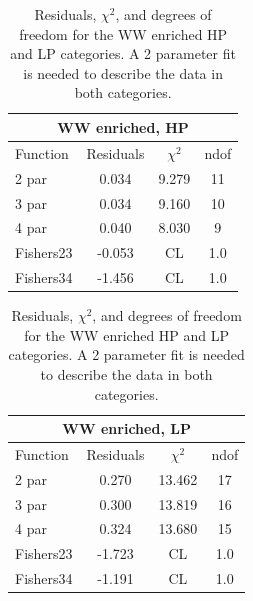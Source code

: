 \begin{table}[h!]
\centering
\begin{tabular}{|l c c c |}
\hline
\multicolumn{4}{|c|}{WW enriched, HP}\\
\hline
Function & Residuals & $\chi^2$ & ndof \\
\hline
2 par & 0.034 & 9.279 & 11 \\
3 par & 0.034 & 9.160 & 10 \\
4 par & 0.040 & 8.030 & 9 \\
\hline
\hline
Fishers23  & -0.053 &CL &1.0\\
Fishers34  & -1.456 &CL &1.0\\
\hline
\end{tabular}
\quad
\begin{tabular}{|l c c c |}
\hline
\multicolumn{4}{|c|}{WW enriched, LP}\\
\hline
Function & Residuals & $\chi^2$ & ndof \\
\hline
2 par & 0.270 & 13.462 & 17 \\
3 par & 0.300 & 13.819 & 16 \\
4 par & 0.324 & 13.680 & 15 \\
\hline
\hline
Fishers23 & -1.723& CL & 1.0\\
Fishers34 & -1.191& CL & 1.0\\
\hline
\end{tabular}
\caption{Residuals, $\chi^{2}$, and degrees of freedom for the WW enriched HP and LP categories. A 2 parameter fit is needed to describe the data in both categories.}
\label{tab:WW_enriched}
\end{table}


